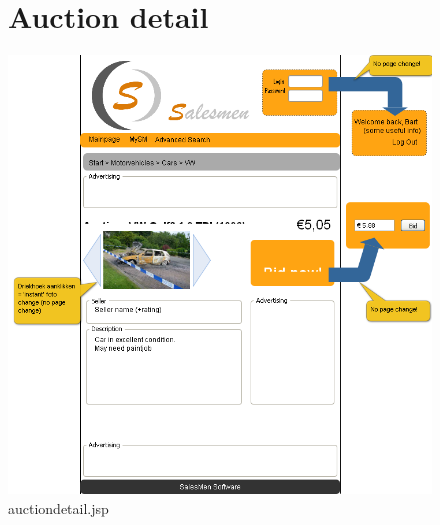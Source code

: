 \documentclass[salesmen, twoside]{../../../templates/latex/2009/softproj}
\begin{document}
\begin{projdoc}
\begin{figure}
\section{Auction detail}
\label{fig_prototype_auctiondetail}
\includegraphics[width=15cm]{../../img/SM_auction_detail.png}
\caption{auctiondetail.jsp}
\end{figure}
\begin{figure}

\end{figure}
\end{projdoc}
\end{document}
